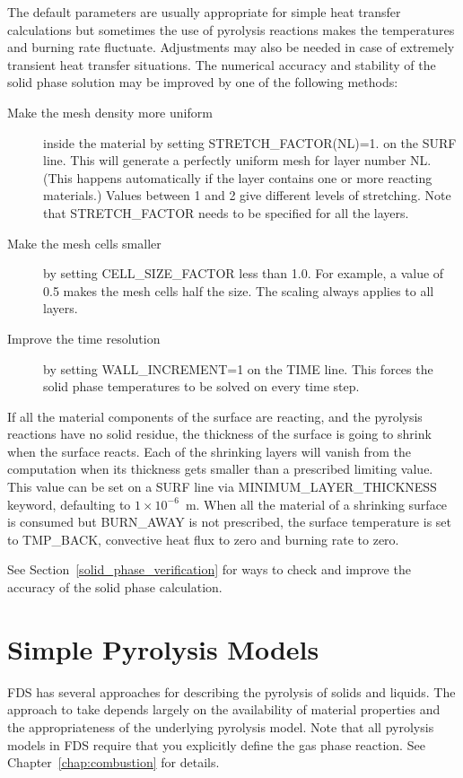 \documentclass[11pt]{book}
\begin{document}
The default parameters are usually appropriate for simple heat transfer calculations but sometimes the use of pyrolysis reactions
makes the temperatures and burning rate fluctuate. Adjustments may also be needed in case of
extremely transient heat transfer situations. The numerical accuracy and stability of the solid phase solution may be improved by
one of the following methods:
\begin{description}
\item[Make the mesh density more uniform ] inside the material by setting {\ct STRETCH\_FACTOR(NL)=1.} on the {\ct SURF} line. This will generate a perfectly uniform mesh for layer number {\ct NL}. (This happens automatically if the layer contains one or more reacting materials.) Values between 1 and 2 give different levels of stretching. Note that {\ct STRETCH\_FACTOR} needs to be specified for all the layers.
\item[Make the mesh cells smaller] by setting {\ct CELL\_SIZE\_FACTOR} less than 1.0. For example, a value of 0.5 makes the mesh cells half the size. The scaling always applies to all layers.
\item[Improve the time resolution] by setting {\ct WALL\_INCREMENT=1} on the {\ct TIME} line. This forces the solid phase temperatures to be solved on every time step.
\end{description}
If all the material components of the surface are reacting, and the pyrolysis reactions have no solid residue, the thickness of
the surface is going to shrink when the surface reacts. Each of the shrinking layers will vanish from the computation when its thickness gets
smaller than a prescribed limiting value. This value can be set on a {\ct SURF} line via {\ct MINIMUM\_LAYER\_THICKNESS} keyword,
defaulting to $1 \times 10^{-6}$~m. When all the material of a shrinking surface is consumed but {\ct BURN\_AWAY} is not
prescribed, the surface temperature is set to {\ct TMP\_BACK}, convective heat flux to zero and burning rate to zero.

See Section~\ref{solid_phase_verification} for ways to check and improve the accuracy of the solid phase calculation.




\section{Simple Pyrolysis Models}

FDS has several approaches for describing the pyrolysis of solids and liquids. The approach to take depends largely
on the availability of material properties and the appropriateness of the underlying pyrolysis model.
Note that all pyrolysis models in FDS require that you explicitly define the gas phase reaction. See Chapter~\ref{chap:combustion} for details.
\end{document}
